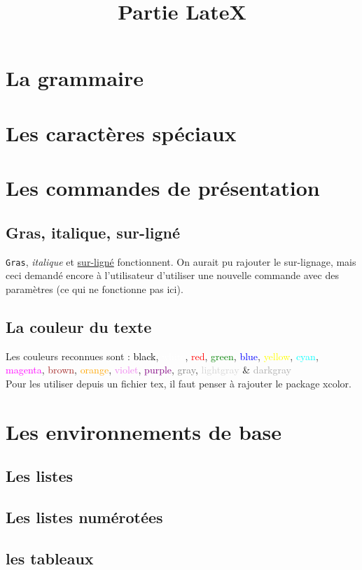 \documentclass[10pt,a4paper]{report}
\begin{document}
\title{Partie LateX}


\tableofcontents

\section{La grammaire}

\section{Les caractères spéciaux}

\section{Les commandes de présentation}
\subsection{Gras, italique, sur-ligné}
\texttt{Gras}, \textit{italique} et \underline{sur-ligné} fonctionnent.
On aurait pu rajouter le sur-lignage, mais ceci demandé encore à l'utilisateur d'utiliser une nouvelle commande avec des paramètres (ce qui ne fonctionne pas ici).
\subsection{La couleur du texte}
Les couleurs reconnues sont : \textcolor{black}{black}, \textcolor{white}{white}, \textcolor{red}{red}, \textcolor{green}{green}, \textcolor{blue}{blue}, \textcolor{yellow}{yellow}, \textcolor{cyan}{cyan}, \textcolor{magenta}{magenta}, \textcolor{brown}{brown}, \textcolor{orange}{orange}, \textcolor{violet}{violet}, \textcolor{purple}{purple}, \textcolor{gray}{gray}, \textcolor{lightgray}{lightgray} & \textcolor{darkgray}{darkgray}\\Pour les utiliser depuis un fichier tex, il faut penser à rajouter le package xcolor.


\section{Les environnements de base}
\subsection{Les listes}
\subsection{Les listes numérotées}
\subsection{les tableaux}
\end{document}
